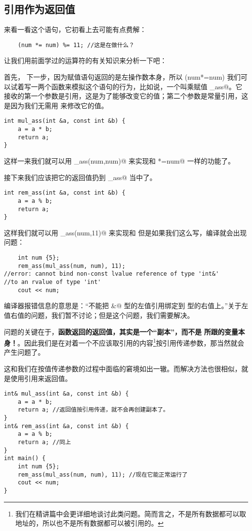 \subsection*{引用作为返回值}
来看一看这个语句，它初看上去可能有点费解：
\begin{lstlisting}
    (num *= num) %= 11; //这是在做什么？
\end{lstlisting}
让我们用前面学过的运算符的有关知识来分析一下吧：\par
首先，\lstinline@%=@ 运算符把 \lstinline@(num*=num)@ 与 \lstinline@11@ 隔开。而在 \lstinline@num*=num@ 表达式中，\lstinline@*=@的作用是乘赋值，于是这个表达式的作用是把 \lstinline@num@ 变成 \lstinline@num@ 的平方。\par
下一步，因为赋值语句返回的是左操作数本身，所以 \lstinline@(num*=num)%=11@ 的作用相当于 \lstinline@num%=11@。\par
我们可以试着写一两个函数来模拟这个语句的行为，比如说，一个叫乘赋值 \lstinline@mul_ass@。它接收的第一个参数是引用，这是为了能够改变它的值；第二个参数是常量引用，这是因为我们无需用 \lstinline@b@ 来修改它的值。
\begin{lstlisting}
int mul_ass(int &a, const int &b) {
    a = a * b;
    return a;
}
\end{lstlisting}
这样一来我们就可以用 \lstinline@mul_ass(num,num)@ 来实现和 \lstinline@num*=num@ 一样的功能了。\par
接下来我们应该把它的返回值扔到 \lstinline@rem_ass@ 当中了。
\begin{lstlisting}
int rem_ass(int &a, const int &b) {
    a = a % b;
    return a;
}
\end{lstlisting}
这样我们就可以用 \lstinline@rem_ass(num,11)@ 来实现和 \lstinline@num%=11@ 一样的功能了。\par
但是如果我们这么写，编译就会出现问题：
\begin{lstlisting}
    int num {5};
    rem_ass(mul_ass(num, num), 11);
//error: cannot bind non-const lvalue reference of type 'int&'
//to an rvalue of type 'int'
    cout << num;
\end{lstlisting}
编译器报错信息的意思是：``不能把 \lstinline@int&@ 型的左值引用绑定到 \lstinline@int@ 型的右值上。''关于左值右值的问题，我们暂不讨论；但是这个问题，我们需要解决。\par
问题的关键在于，\textbf{函数返回的返回值，其实是一个``副本''，而不是 \lstinline@return@ 所跟的变量本身！}。因此我们是在对着一个不应该取引用的内容\footnote{我们在精讲篇中会更详细地谈讨此类问题。简而言之，不是所有数据都可以取地址的，所以也不是所有数据都可以被引用的。}按引用传递参数，那当然就会产生问题了。\par
这和我们在按值传递参数的过程中面临的窘境如出一辙。而解决方法也很相似，就是使用引用来返回值。\par
\begin{lstlisting}
int& mul_ass(int &a, const int &b) {
    a = a * b;
    return a; //返回值按引用传递，就不会再创建副本了。
}
int& rem_ass(int &a, const int &b) {
    a = a % b;
    return a; //同上
}
int main() {
    int num {5};
    rem_ass(mul_ass(num, num), 11); //现在它能正常运行了
    cout << num;
}
\end{lstlisting}
